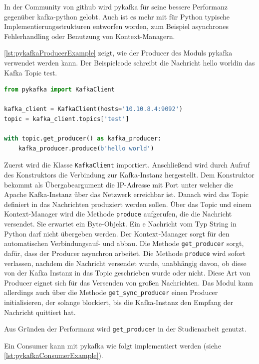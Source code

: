 \documentclass[a4paper,titlepage,halfparskip,12pt]{scrreprt}
\begin{document}
\begin{onehalfspacing}
In der Community von github wird pykafka für seine bessere Performanz gegenüber kafka-python gelobt. Auch ist es mehr mit für Python typische Implementierungsstrukturen entworfen worden, zum Beispiel asynchrones Fehlerhandling oder Benutzung von Kontext-Managern.\cite{pykafkaGithubMeaning}

\autoref{lst:pykafkaProducerExample} zeigt, wie der Producer des Moduls pykafka verwendet werden kann. Der Beispielcode schreibt die Nachricht \glqq hello world\grqq in das Kafka Topic \glqq test\grqq.

\begin{lstlisting}[language=python, caption={Beispiel: Verwendung des Producers des Moduls pykafka}, label={lst:pykafkaProducerExample}]
from pykafka import KafkaClient

kafka_client = KafkaClient(hosts='10.10.8.4:9092')
topic = kafka_client.topics['test']

with topic.get_producer() as kafka_producer:
    kafka_producer.produce(b'hello world')
\end{lstlisting}

Zuerst wird die Klasse \texttt{KafkaClient} importiert. Anschließend wird durch Aufruf des Konstruktors die Verbindung zur Kafka-Instanz hergestellt. Dem Konstruktor bekommt als Übergabeargument die IP-Adresse mit Port unter welcher die Apache Kafka-Instanz über das Netzwerk erreichbar ist. Danach wird das Topic definiert in das Nachrichten produziert werden sollen. Über das Topic und einem Kontext-Manager wird die Methode \texttt{produce} aufgerufen, die die Nachricht versendet. Sie erwartet ein Byte-Objekt. Ein e Nachricht vom Typ String in Python darf nicht übergeben werden.  Der Kontext-Manager sorgt für den automatischen Verbindungsauf- und abbau. Die Methode \texttt{get\_producer} sorgt, dafür, dass der Producer asynchron arbeitet. Die Methode \texttt{produce} wird sofort verlassen, nachdem die Nachricht versendet wurde, unabhängig davon, ob diese von der Kafka Instanz in das Topic geschrieben wurde oder nicht. Diese Art von Producer eignet sich für das Versenden von großen Nachrichten. Das Modul kann allerdings auch über die Methode \texttt{get\_sync\_producer} einen Producer initialisieren, der solange blockiert, bis die Kafka-Instanz den Empfang der Nachricht quittiert hat.

Aus Gründen der Performanz wird \texttt{get\_producer} in der Studienarbeit genutzt.

Ein Consumer kann mit pykafka wie folgt implementiert werden (siehe \autoref{lst:pykafkaConsumerExample}).


\end{onehalfspacing}
\end{document}
